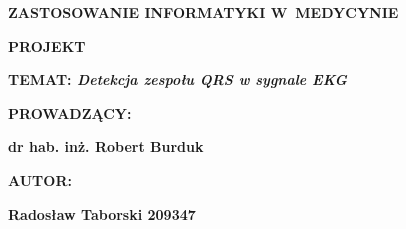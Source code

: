 \clearpage
\thispagestyle{empty}

\begin{center}
	\vspace*{2cm}
	\textbf{{\Huge ZASTOSOWANIE INFORMATYKI W~MEDYCYNIE}}
	
	\vspace{0.8cm}	
	\textbf{{\Huge PROJEKT}}
	
	\vspace{1.6cm}	
	\textbf{{\huge TEMAT:\textit{ Detekcja zespołu QRS w sygnale EKG}}}
	
	\vspace{1.2cm}	
	\textbf{{\LARGE PROWADZĄCY:}}
	
	\vspace{0.1cm}	
	\textbf{{\LARGE dr hab. inż. Robert Burduk}}
\end{center}

\begin{flushright}
	\vspace{6cm}
	\textbf{{\LARGE AUTOR:}}
	
	\vspace{0.1cm}	
	\textbf{{\LARGE Radosław Taborski 209347}}
\end{flushright}


